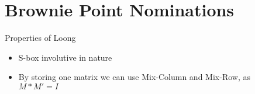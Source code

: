 \section{Brownie Point Nominations}

\begin{frame}{Properties of Loong}
    \begin{itemize}
        \item S-box involutive in nature 
        \pause
        \item By storing one matrix we can use Mix-Column and Mix-Row, as\\
        $M*M' = I$
    \end{itemize}
\end{frame}
